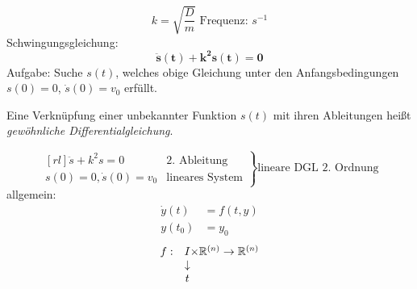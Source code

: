 	\begin{equation*}
		k = \sqrt{\frac{D}{m}} \text{ Frequenz: $s^{-1}$}
	\end{equation*}
	Schwingungsgleichung:
	\begin{equation*}
		\mathbf{\ddot s(t) + k^2 s(t) = 0}
	\end{equation*}
	Aufgabe: Suche $s(t)$, welches obige Gleichung unter den Anfangsbedingungen $s(0) = 0$, $ \dot s(0) = v_0$ erfüllt.
	\begin{definition}
	Eine Verknüpfung einer unbekannter Funktion $s(t)$ mit ihren Ableitungen heißt \emph{gewöhnliche Differentialgleichung}.
	\end{definition}
	
	\begin{equation*}
		\left.
		\begin{matrix}[rl]
			\ddot s + k^2 s = 0 & \text{2. Ableitung} \\
			s(0) = 0, \dot s(0) = v_0 & \text{lineares System}
		\end{matrix}
		\right\}
		\text{lineare DGL 2. Ordnung}
	\end{equation*}
	allgemein:
	\begin{align*}
		\dot y(t) &= f(t, y) \\
		y(t_0) &= y_0
	\end{align*}
	\begin{equation*}
		\begin{matrix}
			f: &I& \hspace{-10px}\times \mathbb{R}^{(n)} \to \mathbb{R}^{(n)} \\
			& \downarrow & \\
			& t &
		\end{matrix}
	\end{equation*}
